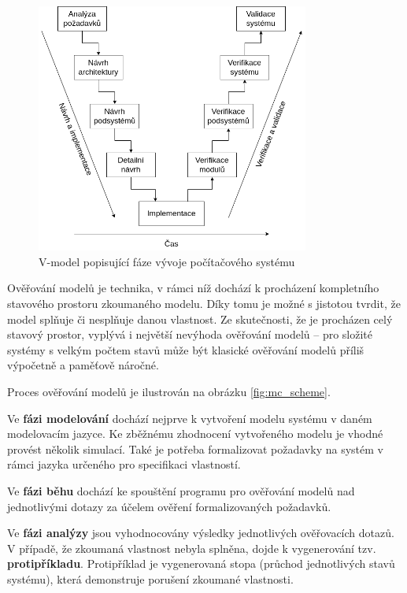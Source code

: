 \begin{figure}[H]
    \centering
    \includegraphics[width=0.8\textwidth]{obrazky-figures/vmodel.png}
    \caption{V-model popisující fáze vývoje počítačového systému}
    \label{fig:vmodel}
\end{figure}

Ověřování modelů je technika, v rámci níž dochází k procházení kompletního stavového prostoru zkoumaného modelu. Díky tomu je možné s jistotou tvrdit, že model splňuje či nesplňuje danou vlastnost. Ze skutečnosti, že je procházen celý stavový prostor, vyplývá i největší nevýhoda ověřování modelů -- pro složité systémy s velkým počtem stavů může být klasické ověřování modelů příliš výpočetně a paměťově náročné.

Proces ověřování modelů je ilustrován na obrázku \ref{fig:mc_scheme}.

Ve \textbf{fázi modelování} dochází nejprve k vytvoření modelu systému v daném modelovacím jazyce. Ke zběžnému zhodnocení vytvořeného modelu je vhodné provést několik simulací. Také je potřeba formalizovat požadavky na systém v rámci jazyka určeného pro specifikaci vlastností.

Ve \textbf{fázi běhu} dochází ke spouštění programu pro ověřování modelů nad jednotlivými dotazy za účelem ověření formalizovaných požadavků.

Ve \textbf{fázi analýzy} jsou vyhodnocovány výsledky jednotlivých ověřovacích dotazů. V případě, že zkoumaná vlastnost nebyla splněna, dojde k vygenerování tzv. \textbf{protipříkladu}. Protipříklad je vygenerovaná stopa (průchod jednotlivých stavů systému), která demonstruje porušení zkoumané vlastnosti.

